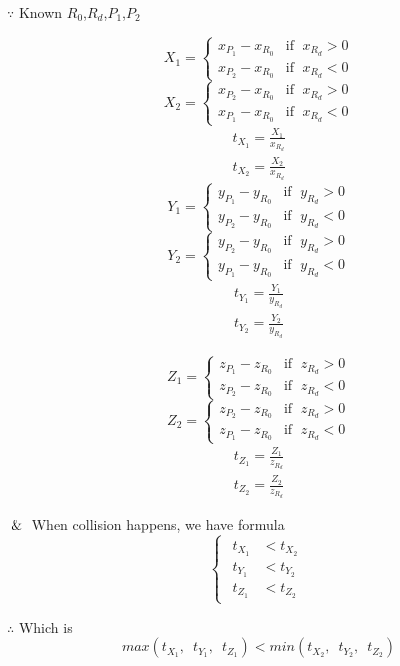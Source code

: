 $\because$ Known $R_0$,\enspace$R_d$,\enspace$P_1$,\enspace$P_2$
\begin{multicols}{2}
\noindent
\[
X_1 =
\begin{cases}
x_{P_1} - x_{R_0} & \text{if }\;x_{R_d} > 0 \\
x_{P_2} - x_{R_0} & \text{if }\;x_{R_d} < 0
\end{cases}
\]
\[
X_2 =
\begin{cases}
x_{P_2} - x_{R_0} & \text{if }\;x_{R_d} > 0 \\
x_{P_1} - x_{R_0} & \text{if }\;x_{R_d} < 0
\end{cases}
\]
\[
\begin{array}{lr}
t_{X_1} = \frac{X_1}{x_{R_d}} \\
t_{X_2} = \frac{X_2}{x_{R_d}}
\end{array}
\]
\columnbreak
\[
Y_1 =
\begin{cases}
y_{P_1} - y_{R_0} & \text{if }\;y_{R_d} > 0 \\
y_{P_2} - y_{R_0} & \text{if }\;y_{R_d} < 0
\end{cases}
\]
\[
Y_2 =
\begin{cases}
y_{P_2} - y_{R_0} & \text{if }\;y_{R_d} > 0 \\
y_{P_1} - y_{R_0} & \text{if }\;y_{R_d} < 0
\end{cases}
\]
\[
\begin{array}{lr}
t_{Y_1} = \frac{Y_1}{y_{R_d}} \\
t_{Y_2} = \frac{Y_2}{y_{R_d}}
\end{array}
\]
\end{multicols}
\begin{multicols}{2}
\noindent
\[
Z_1 =
\begin{cases}
z_{P_1} - z_{R_0} & \text{if }\;z_{R_d} > 0 \\
z_{P_2} - z_{R_0} & \text{if }\;z_{R_d} < 0
\end{cases}
\]
\[
Z_2 =
\begin{cases}
z_{P_2} - z_{R_0} & \text{if }\;z_{R_d} > 0 \\
z_{P_1} - z_{R_0} & \text{if }\;z_{R_d} < 0
\end{cases}
\]
\[
\begin{array}{lr}
t_{Z_1} = \frac{Z_1}{z_{R_d}} \\
t_{Z_2} = \frac{Z_2}{z_{R_d}}
\end{array}
\]
\columnbreak
\[
\]
\end{multicols}

$\And$ When collision happens,  we have formula
\[
\left\{
\begin{array}{lr}
\begin{aligned}
t_{X_1} &< t_{X_2} \\
t_{Y_1} &< t_{Y_2} \\
t_{Z_1} &< t_{Z_2}
\end{aligned}
\end{array}
\right.
\]

$\therefore$ Which is
\begin{equation}\label{equ:ray-box-3d-intersection}
max(t_{X_1},\enspace t_{Y_1},\enspace t_{Z_1}) < min(t_{X_2},\enspace t_{Y_2},\enspace t_{Z_2})
\end{equation}

